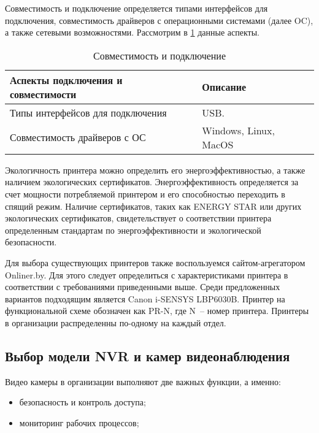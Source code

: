 Совместимость и подключение определяется типами интерфейсов для подключения, совместимость драйверов с операционными 
системами (далее OC), а также сетевыми возможностями.
Рассмотрим в \ref{table:func:printersConnectionProperty} данные аспекты.

\begin{table}[ht]
    \caption{Совместимость и подключение}
    \label{table:func:printersConnectionProperty}
    \begin{tabular}{| >{\raggedright}m{}
                    | >{\raggedright\arraybackslash}m{}|}
        \hline
        \centering Аспекты подключения и совместимости & \centering\arraybackslash Описание \\

        \hline
        Типы интерфейсов для подключения &
        USB.
        \\
        \hline
        Совместимость драйверов с ОС &
        Windows, Linux, MacOS
        \\
        \hline
    \end{tabular}
\end{table}

Экологичность принтера можно определить его энергоэффективностью, а также наличием экологических сертификатов. 
Энергоэффективность определяется за счет мощности потребляемой принтером и его способностью переходить в спящий режим. 
Наличие сертификатов, таких как ENERGY STAR\cite{energystar} или других экологических сертификатов, свидетельствует о соответствии принтера 
определенным стандартам по энергоэффективности и экологической безопасности.

Для выбора существующих принтеров также воспользуемся сайтом-агрегатором Onliner.by. Для этого следует определиться с характеристиками
принтера в соответствии с требованиями приведенными выше. Среди предложенных вариантов подходящим является Canon i-SENSYS LBP6030B.
Принтер на функциональной схеме обозначен как PR-N, где N~-- номер принтера. Принтеры в организации распределенны
по-одному на каждый отдел. 

\subsection{Выбор модели NVR и камер видеонаблюдения}

Видео камеры в организации выполняют две важных функции, а именно:
\begin{itemize}
    \item безопасность и контроль доступа;
    \item мониторинг рабочих процессов;
\end{itemize}

